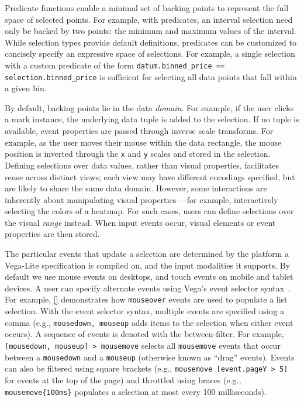 Predicate functions enable a minimal set of backing points to represent the full
space of selected points. For example, with predicates, an interval selection
need only be backed by two points: the minimum and maximum values of the
interval. While selection types provide default definitions, predicates can be
customized to concisely specify an expressive space of selections. For example,
a single selection with a custom predicate of the form
\texttt{datum.binned\_price == selection.binned\_price} is sufficient for
selecting all data points that fall within a given bin.

By default, backing points lie in the data \emph{domain}. For example, if the
user clicks a mark instance, the underlying data tuple is added to the
selection. If no tuple is available, event properties are passed through inverse
scale transforms. For example, as the user moves their mouse within the data
rectangle, the mouse position is inverted through the \texttt{x} and \texttt{y}
scales and stored in the selection. Defining selections over data values, rather
than visual properties, facilitates reuse across distinct views; each view may
have different encodings specified, but are likely to share the same data
domain. However, some interactions are inherently about manipulating visual
properties\,---\,for example, interactively selecting the colors of a heatmap.
For such cases, users can define selections over the visual \emph{range}
instead. When input events occur, visual elements or event properties are then
stored.

The particular events that update a selection are determined by the platform a
Vega-Lite specification is compiled on, and the input modalities it
supports. By default we use mouse events on desktops, and touch events on mobile
and tablet devices. A user can specify alternate events using Vega's event
selector syntax~\cite{reactive-vega-model}. For example,
\cref{} demonstrates how \texttt{mouseover} events are used to
populate a list selection. With the event selector syntax, multiple events are
specified using a comma (e.g., \texttt{mousedown, mouseup} adds items to the
selection when either event occurs). A sequence of events is denoted with the
between-filter. For example, \texttt{[mousedown, mouseup] > mousemove} selects
all \texttt{mousemove} events that occur between a \texttt{mousedown} and a
\texttt{mouseup} (otherwise known as ``drag'' events). Events can also be
filtered using square brackets (e.g., \texttt{mousemove [event.pageY > 5]} for
events at the top of the page) and throttled using braces (e.g.,
\texttt{mousemove\{100ms\}} populates a selection at most every 100
milliseconds).

